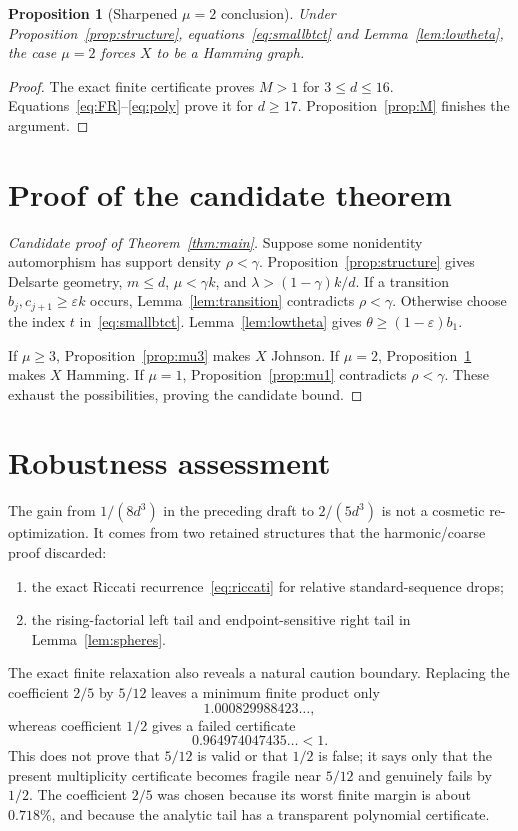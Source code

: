 \documentclass[11pt]{amsart}
\newtheorem{proposition}[theorem]{Proposition}
\theoremstyle{definition}
\newcommand{\eps}{\varepsilon}
\newcommand{\gam}{\gamma}
\begin{document}
\begin{proposition}[Sharpened $\mu=2$ conclusion]\label{prop:mu2}
Under Proposition~\ref{prop:structure}, equations~\eqref{eq:smallbtct} and Lemma~\ref{lem:lowtheta}, the case $\mu=2$ forces $X$ to be a Hamming graph.
\end{proposition}

\begin{proof}
The exact finite certificate proves $M>1$ for $3\le d\le16$.  Equations~\eqref{eq:FR}--\eqref{eq:poly} prove it for $d\ge17$.  Proposition~\ref{prop:M} finishes the argument.
\end{proof}

\section{Proof of the candidate theorem}
\begin{proof}[Candidate proof of Theorem~\ref{thm:main}]
Suppose some nonidentity automorphism has support density $\rho<\gam$.  Proposition~\ref{prop:structure} gives Delsarte geometry, $m\le d$, $\mu<\gam k$, and $\lambda>(1-\gam)k/d$.  If a transition $b_j,c_{j+1}\ge\eps k$ occurs, Lemma~\ref{lem:transition} contradicts $\rho<\gam$.  Otherwise choose the index $t$ in~\eqref{eq:smallbtct}.  Lemma~\ref{lem:lowtheta} gives $\theta\ge(1-\eps)b_1$.

If $\mu\ge3$, Proposition~\ref{prop:mu3} makes $X$ Johnson.  If $\mu=2$, Proposition~\ref{prop:mu2} makes $X$ Hamming.  If $\mu=1$, Proposition~\ref{prop:mu1} contradicts $\rho<\gam$.  These exhaust the possibilities, proving the candidate bound.
\end{proof}

\section{Robustness assessment}
The gain from $1/(8d^3)$ in the preceding draft to $2/(5d^3)$ is not a cosmetic re-optimization.  It comes from two retained structures that the harmonic/coarse proof discarded:
\begin{enumerate}[leftmargin=2.2em,itemsep=0.35em]
\item the exact Riccati recurrence~\eqref{eq:riccati} for relative standard-sequence drops;
\item the rising-factorial left tail and endpoint-sensitive right tail in Lemma~\ref{lem:spheres}.
\end{enumerate}
The exact finite relaxation also reveals a natural caution boundary.  Replacing the coefficient $2/5$ by $5/12$ leaves a minimum finite product only
\[
 1.000829988423\ldots,
\]
whereas coefficient $1/2$ gives a failed certificate
\[
 0.964974047435\ldots<1.
\]
This does not prove that $5/12$ is valid or that $1/2$ is false; it says only that the present multiplicity certificate becomes fragile near $5/12$ and genuinely fails by $1/2$.  The coefficient $2/5$ was chosen because its worst finite margin is about $0.718\%$, and because the analytic tail has a transparent polynomial certificate.
\end{document}
